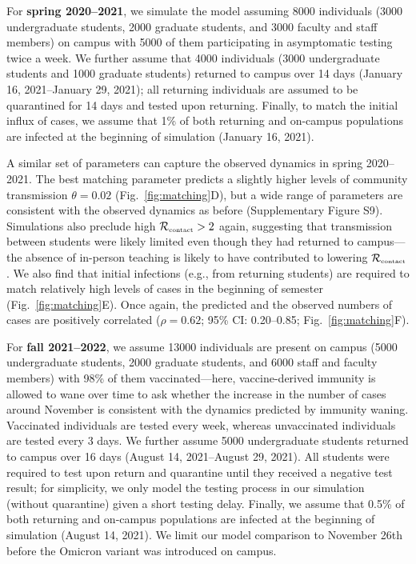 \documentclass[12pt]{article}
\newcommand{\fref}[1]{Fig.~\ref{fig:#1}}
\newcommand{\Rx}[1]{\ensuremath{{\mathcal R}_{#1}}}
\newcommand{\Rc}{\Rx{\textrm{\tiny{contact}}}}
\begin{document}
For \textbf{spring 2020--2021}, we simulate the model assuming 8000 individuals (3000 undergraduate students, 2000 graduate students, and 3000 faculty and staff members) on campus with 5000 of them participating in asymptomatic testing twice a week.
We further assume that 4000 individuals (3000 undergraduate students and 1000 graduate students) returned to campus over 14 days (January 16, 2021--January 29, 2021);
all returning individuals are assumed to be quarantined for 14 days and tested upon returning. 
Finally, to match the initial influx of cases, we assume that 1\% of both returning and on-campus populations are infected at the beginning of simulation (January 16, 2021).

A similar set of parameters can capture the observed dynamics in spring 2020--2021.
The best matching parameter predicts a slightly higher levels of community transmission $\theta=0.02$ (\fref{matching}D), but a wide range of parameters are consistent with the observed dynamics as before (Supplementary Figure S9). 
Simulations also preclude high $\Rc > 2$ again, suggesting that transmission between students were likely limited even though they had returned to campus---the absence of in-person teaching is likely to have contributed to lowering $\Rc$.
We also find that initial infections (e.g., from returning students) are required to match relatively high levels of cases in the beginning of semester (\fref{matching}E). 
Once again, the predicted and the observed numbers of cases are positively correlated ($\rho = 0.62$; 95\% CI: 0.20--0.85; \fref{matching}F).

For \textbf{fall 2021--2022}, we assume 13000 individuals are present on campus (5000 undergraduate students, 2000 graduate students, and 6000 staff and faculty members) with 98\% of them vaccinated---here, vaccine-derived immunity is allowed to wane over time to ask whether the increase in the number of cases around November is consistent with the dynamics predicted by immunity waning.
Vaccinated individuals are tested every week, whereas unvaccinated individuals are tested every 3 days. 
We further assume 5000 undergraduate students returned to campus over 16 days (August 14, 2021--August 29, 2021).
All students were required to test upon return and quarantine until they received a negative test result;
for simplicity, we only model the testing process in our simulation (without quarantine) given a short testing delay.
Finally, we assume that 0.5\% of both returning and on-campus populations are infected at the beginning of simulation (August 14, 2021).
We limit our model comparison to November 26th before the Omicron variant was introduced on campus.
\end{document}
